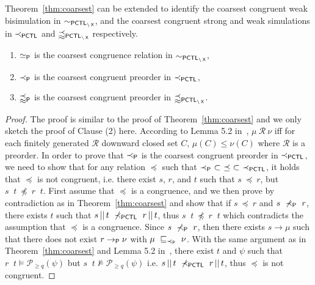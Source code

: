 \documentclass{LMCS}
\DeclareMathOperator{\interleave}{||}
\DeclareMathOperator{\X}{\text{\sf X}}
\newcommand{\TRAN}[2]{#1\rightarrow #2}
\newcommand{\TRANP}[2]{#1\rightarrow_{{\sf P}}#2}
\newcommand{\SP}{\ensuremath{\prec_{{\sf P}}}}
\newcommand{\PCTL}{{\sf PCTL}}
\newcommand{\SEPCTL}{\prec_{\PCTL}}
\newcommand{\PAR}[2]{#1\interleave#2}
\newcommand{\bBSP}{\simeq_{{\sf P}}}
\newcommand{\bSiP}{\precapprox_{{\sf P}}}
\newcommand{\MC}[1]{\mathcal{#1}}
\newcommand{\DSI}[1][\MC{R}]{\sqsubseteq_{#1}}
\newcommand{\EPCTLWN}{\sim_{\PCTL_{\backslash\X}}}
\newcommand{\SEPCTLWN}{\precapprox_{\PCTL_{\backslash\X}}}
\begin{document}
Theorem~\ref{thm:coarsest} can be extended to identify the coarsest congruent weak bisimulation in $\EPCTLWN$, and the coarsest congruent strong and weak simulations in $\SEPCTL$ and $\SEPCTLWN$ respectively.
\begin{thm}\label{thm:coarsest 1}\hfill
\begin{enumerate}[\em(1)]
\item $\bBSP$ is the coarsest congruence relation in $\EPCTLWN$,
\item $\SP$ is the coarsest congruent preorder in $\SEPCTL$,
\item $\bSiP$ is the coarsest congruent preorder in $\SEPCTLWN$.
\end{enumerate}
\end{thm}
\begin{proof}
The proof is similar to the proof of Theorem~\ref{thm:coarsest} and we only sketch the proof of Clause (2) here. According to Lemma 5.2 in~\cite{HermannsPSWZ11}, $\mu~\MC{R}~\nu$ iff for each finitely generated $\MC{R}$ downward closed set $C$, $\mu(C)\leq\nu(C)$ where $\MC{R}$ is a preorder. In order to prove that $\SP$ is the coarsest congruent preorder in $\SEPCTL$, we need to show that for any relation $\preceq$ such that $\SP~\subset~\preceq~\subset~\SEPCTL$, it holds that $\preceq$ is not congruent, i.e. there exist $s$, $r$, and $t$ such that $s~\preceq~r$, but $\PAR{s}{t}~\not\preceq~\PAR{r}{t}$. First assume that $\preceq$ is a congruence, and we then prove by contradiction as in Theorem~\ref{thm:coarsest} and show that if $s~\preceq~r$ and $s~\not\SP~r$, there exists $t$ such that $\PAR{s}{t}~\not\SEPCTL~\PAR{r}{t}$, thus $\PAR{s}{t}~\not\preceq~\PAR{r}{t}$ which contradicts the assumption that $\preceq$ is a congruence. Since $s~\not\SP~r$, then there exists $s\TRAN{}\mu$ such that there does not exist $r\TRANP{}\nu$ with $\mu~\DSI[\SP]~\nu$. With the same argument as in Theorem~\ref{thm:coarsest} and Lemma 5.2 in~\cite{HermannsPSWZ11}, there exist $t$ and $\psi$ such that $\PAR{r}{t}\models\MC{P}_{\geq q}(\psi)$ but $\PAR{s}{t}\not\models\MC{P}_{\geq q}(\psi)$ i.e. $\PAR{s}{t}~\not\SEPCTL~\PAR{r}{t}$, thus $\preceq$ is not congruent.
\end{proof}
\end{document}
